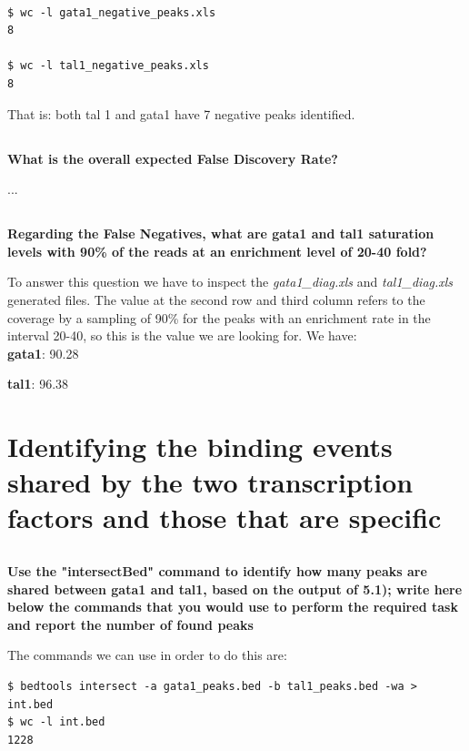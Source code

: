 \documentclass[12pt, a4paper]{article}
\begin{document}
\begin{verbatim}

$ wc -l gata1_negative_peaks.xls
8

$ wc -l tal1_negative_peaks.xls
8

\end{verbatim}

That is: both tal 1 and gata1 have 7 negative peaks identified.

\subsection{}
\textbf{What is the overall expected False Discovery Rate?}

...

\subsection{}
\textbf{Regarding the False Negatives, what are gata1 and tal1 saturation levels with 90\% of the reads at an enrichment level of 20-40 fold?}

To answer this question we have to inspect the \textit{gata1\_diag.xls } and \textit{tal1\_diag.xls} generated files. The value at the second row and third column refers to the coverage by a sampling of 90\% for the peaks with an enrichment rate in the interval 20-40, so this is the value we are looking for. We have:\\

\textbf{gata1}: 90.28

\textbf{tal1}: 96.38


\section{Identifying the binding events shared by the two transcription factors and those that are specific}

\subsection{}
\textbf{Use the "intersectBed" command to identify how many peaks are shared between gata1 and tal1, based on the output of 5.1); write here below the commands that you would use to perform the required task and report the number of found peaks}

The commands we can use in order to do this are:

\begin{verbatim}
$ bedtools intersect -a gata1_peaks.bed -b tal1_peaks.bed -wa > int.bed
$ wc -l int.bed
1228
\end{verbatim}
\end{document}
